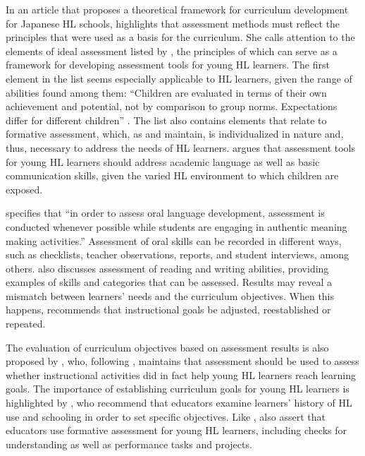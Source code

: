 \documentclass[output=paper]{langscibook}
\begin{document}
In an article that proposes a theoretical framework for curriculum development for Japanese HL schools, \citet[71]{Douglas2005} highlights that assessment methods must reflect the principles that were used as a basis for the curriculum. She calls attention to the elements of ideal assessment listed by \citet{GutierrezSlavin1992}, the principles of which can serve as a framework for developing assessment tools for young HL learners. The first element in the list seems especially applicable to HL learners, given the range of abilities found among them: “Children are evaluated in terms of their own achievement and potential, not by comparison to group norms. Expectations differ for different children” \citep[71]{Douglas2005}. The list also contains elements that relate to formative assessment, which, as \citet{Douglas2008} and \citet{Carreira2012a,Carreira2012b} maintain, is individualized in nature and, thus, necessary to address the needs of HL learners. \citet[72]{Douglas2005} argues that assessment tools for young HL learners should address academic language as well as basic communication skills, given the varied HL environment to which children are exposed.

\citet[256]{Douglas2008} specifies that “in order to assess oral language development, assessment is conducted whenever possible while students are engaging in authentic meaning making activities.” Assessment of oral skills can be recorded in different ways, such as checklists, teacher observations, reports, and student interviews, among others. \citet{Douglas2008} also discusses assessment of reading and writing abilities, providing examples of skills and categories that can be assessed. Results may reveal a mismatch between learners’ needs and the curriculum objectives. When this happens, \citet[259]{Douglas2008} recommends that instructional goals be adjusted, reestablished or repeated.

The evaluation of curriculum objectives based on assessment results is also proposed by \citet{Boruchowski2015}, who, following \citet{WigginsMcTighe2005}, maintains that assessment should be used to assess whether instructional activities did in fact help young HL learners reach learning goals. The importance of establishing curriculum goals for young HL learners is highlighted by \citet{SilvaBoruchowski2016}, who recommend that educators examine learners’ history of HL use and schooling in order to set specific objectives. Like \citet{Douglas2005,Douglas2008}, \citet{SilvaBoruchowski2016} also assert that educators use formative assessment for young HL learners, including checks for understanding as well as performance tasks and projects.
\end{document}

